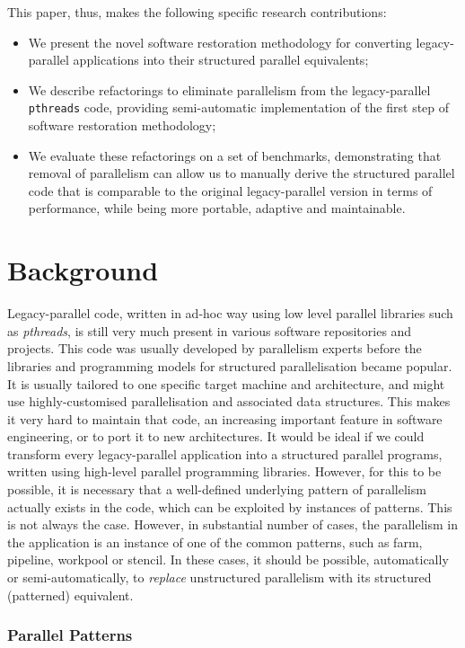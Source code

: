 This paper, thus, makes the following specific research contributions:
\begin{itemize}
    \item We present the novel software restoration methodology for converting legacy-parallel applications into their structured parallel equivalents;
    \item We describe refactorings to eliminate parallelism from the legacy-parallel \lstinline{pthreads} code, providing semi-automatic implementation of the first step of software restoration methodology;
    \item We evaluate these refactorings on a set of benchmarks, demonstrating that removal of parallelism can allow us to manually derive the structured parallel code that is comparable to the original legacy-parallel version in terms of performance, while being more portable, adaptive and maintainable.
\end{itemize}

\section{Background}
Legacy-parallel code, written in ad-hoc way using low level parallel libraries such as \emph{pthreads}, is still very much present in various software repositories and projects. This code was usually developed by parallelism experts before the libraries and programming models for structured parallelisation became popular. It is usually tailored to one specific target machine and architecture, and might use highly-customised parallelisation and associated data structures. This makes it very hard to maintain that code, an increasing important feature in software engineering, or to port it to new architectures. It would be ideal if we could transform every legacy-parallel application into a structured parallel programs, written using high-level parallel programming libraries. However, for this to be possible, it is necessary that a well-defined underlying pattern of parallelism actually exists in the code, which can be exploited by instances of patterns. This is not always the case. However, in substantial number of cases, the parallelism in the application is an instance of one of the common patterns, such as farm, pipeline, workpool or stencil. In these cases, it should be possible, automatically or semi-automatically, to \emph{replace} unstructured parallelism with its structured (patterned) equivalent.   

\subsubsection*{Parallel Patterns}



